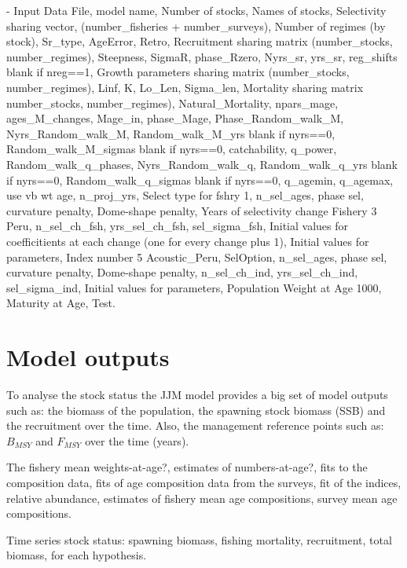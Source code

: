 \documentclass{article}
\begin{document}
- Input Data File, model name, Number of stocks, Names of stocks, Selectivity sharing vector, (number\_fisheries + number\_surveys), Number of regimes (by stock), Sr\_type, AgeError, Retro, Recruitment sharing matrix (number\_stocks, number\_regimes), Steepness, SigmaR, phase\_Rzero, Nyrs\_sr, yrs\_sr, reg\_shifts blank if nreg==1, Growth parameters sharing matrix (number\_stocks, number\_regimes), Linf, K, Lo\_Len, Sigma\_len, Mortality sharing matrix number\_stocks, number\_regimes), Natural\_Mortality, npars\_mage, ages\_M\_changes, Mage\_in, phase\_Mage, Phase\_Random\_walk\_M, Nyrs\_Random\_walk\_M, Random\_walk\_M\_yrs blank if nyrs==0, Random\_walk\_M\_sigmas blank if nyrs==0, catchability, q\_power, Random\_walk\_q\_phases, Nyrs\_Random\_walk\_q, Random\_walk\_q\_yrs blank if nyrs==0, Random\_walk\_q\_sigmas blank if nyrs==0, q\_agemin, q\_agemax, use vb wt age, n\_proj\_yrs, Select type for fshry 1, n\_sel\_ages, phase sel, curvature penalty, Dome-shape penalty, Years of selectivity change Fishery 3 Peru, n\_sel\_ch\_fsh, yrs\_sel\_ch\_fsh, sel\_sigma\_fsh, Initial values for coefficitients at each change (one for every change plus 1), Initial values for parameters, Index number 5 Acoustic\_Peru, SelOption, n\_sel\_ages, phase sel, curvature penalty, Dome-shape penalty, n\_sel\_ch\_ind, yrs\_sel\_ch\_ind, sel\_sigma\_ind, Initial values for parameters, Population Weight at Age 1000, Maturity at Age, Test.



\section{Model outputs}

To analyse the stock status the JJM model provides a big set of model outputs such as: the biomass of the population, the spawning stock biomass (SSB) and the recruitment over the time. Also, the management reference points such as: \(B_{MSY}\) and \(F_{MSY}\) over the time (years).

The fishery mean weights-at-age?, estimates of numbers-at-age?, fits to the composition data, fits of age composition data from the surveys, fit of the indices, relative abundance, estimates of fishery mean age compositions, survey mean age compositions.

Time series stock status: spawning biomass, fishing mortality, recruitment, total biomass, for each hypothesis.

\end{document}
